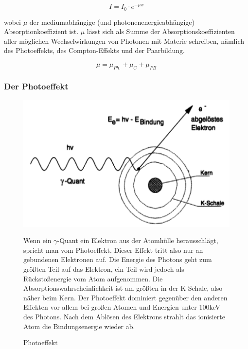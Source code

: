 $$ I = I_0\cdot e^{-\mu x} $$

wobei $\mu$ der mediumabhängige (und photonenenergieabhängige) Absorptionkoeffizient ist. $\mu$ lässt sich als Summe der Absorptionskoeffizienten aller möglichen Wechselwirkungen von Photonen mit Materie schreiben, nämlich des Photoeffekts, des Compton-Effekts und der Paarbildung.

$$\mu = \mu_{Ph.} + \mu_{C} + \mu_{PB} $$

\subsubsection{Der Photoeffekt}

\begin{figure}[H]
	\begin{minipage}{0.6\textwidth}
	\centering \includegraphics[width=\textwidth]{Bilder/Photoeffekt.png}
	\caption{Photoeffekt}
	\end{minipage}
	\begin{minipage}{0.4\textwidth}
	Wenn ein $\gamma$-Quant ein Elektron aus der Atomhülle herausschlägt, spricht man vom Photoeffekt. 	Dieser Effekt tritt also nur an gebundenen Elek\-tro\-nen auf. Die Energie des Photons geht zum größten Teil 	auf das Elektron, ein Teil wird jedoch als Rückstoßenergie vom Atom aufgenommen. Die 				Ab\-sorp\-tions\-wahrscheinlichkeit ist am größten in der K-Schale, also näher beim Kern. Der Photoeffekt 	dominiert gegenüber den anderen Effekten vor allem bei großen Atomen und Energien unter 100keV des	Photons. Nach dem Ablösen des Elektrons strahlt das ionisierte Atom die Bindungsenergie wieder ab.
	\end{minipage}
\end{figure}

